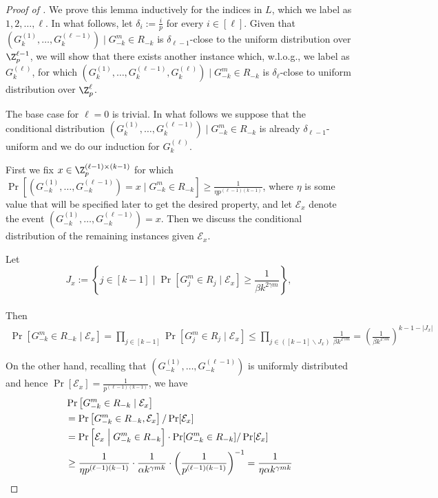 \documentclass{toc}
\newcommand{\set}[1]{{\left \{{#1} \right \}}}
\newcommand{\cond}{\;|\;}
\newcommand{\Cond}{\;\Big|\;}
\newcommand{\error}{\ensuremath{\delta}}
\newcommand{\eqdef}{\ensuremath{:=}}
\newcommand{\event}{\ensuremath{\mathcal{E}}}
\begin{document}
	\begin{proof}[Proof of ]
		We prove this lemma inductively for the indices in $L$, {\color{black}which we label as $1,2, \dots, \ell$.}
		In what follows, let $\error_{i}\eqdef \frac{i}{p}$ for every $i\in [\ell]$.
		Given that $\left(G_k^{(1)},\dots,G_k^{(\ell-1)}\right)\Cond G_{-k}^m \in R_{-k}$ is $\error_{\ell-1}$-close to the uniform distribution over $\Z_p^{\ell-1}$, we will show that there exists another instance which, w.l.o.g., we label as $G_k^{(\ell)} $, for which 
		$\left(G_k^{(1)},\dots,G_k^{(\ell-1)},G_k^{(\ell)}\right)\Cond G_{-k}^m \in R_{-k}$ is $\error_{\ell}$-close to uniform distribution over $\Z_p^{\ell}$.
		
		The base case for $\ell=0$ is trivial. 
		In what follows we suppose that the conditional distribution $\left(G_k^{(1)},\dots,G_k^{(\ell-1)}\right)\Cond G_{-k}^m \in R_{-k}$ is already $\error_{\ell-1}$-uniform and we do our induction for $G_k^{(\ell)}$.

		First we fix $x\in \Z_p^{(\ell-1)\times (k-1)}$ for which $\Pr\left[\left(G_{-k}^{(1)},\dots,G_{-k}^{(\ell-1)}\right)=x \cond G_{-k}^m\in R_{-k} \right] \ge \frac{1}{\eta  p^{(\ell-1)(k-1)}}$, {\color{black} where $\eta$ is some value that will be specified later to get the desired property,}
		and let $\event_x$ denote  the event 
		$\left(G_{-k}^{(1)},\dots,G_{-k}^{(\ell-1)}\right)=x$.  
		Then we discuss the conditional distribution of the remaining instances given $\event_x$.


		Let
		$$J_x \eqdef \set{j\in [k-1] \; \Big| \; \Pr\left[G^m_j\in R_j\; \big| \; \event_x\right] \ge \frac{1}{\beta k^{2\gamma m}} },$$
		\\
		Then
		\begin{align}\label{ineq:A1_upper}
			\Pr\left[ G^m_{-k}\in R_{-k} \cond \event_x \right] =
		\prod_{j\in [k-1]} 
			\Pr\left[ G_j^m\in R_j \cond  \event_x \right]
			\le 
			\prod_{j\in ([k-1]\backslash J_x)} \frac{1}{\beta k^{2\gamma m}} = \left( \frac{1}{\beta k^{2\gamma m}} \right)^{k-1-|J_x|}
		\end{align}


		On the other hand, recalling that $\left(G_{-k}^{(1)},\dots,G_{-k}^{(\ell-1)}\right)$ is uniformly distributed and hence $\Pr[\event_x]=\frac{1}{p^{(\ell-1)(k-1)}}$, we have
		\begin{align}
			& \Pr\left[ G^m_{-k}\in R_{-k} \cond \event_x \right] \notag \\
			&=\Pr\left[G^m_{-k}\in R_{-k},\event_x\right] / \Pr[\event_x]
			\notag\\
			&= \Pr\left[ \event_x \Cond G_{-k}^m\in R_{-k} \right] \cdot \Pr[G_{-k}^m\in R_{-k}]/\Pr[\event_x] \notag \\
			&\ge  \frac{1}{\eta p^{(\ell-1)(k-1)}} \cdot \frac{1}{\alpha k^{\gamma mk}} \cdot \left(\frac{1}{p^{(\ell-1)(k-1)}}\right)^{-1}
			=\frac{1}{\eta \alpha k^{\gamma mk}}
			\label{ineq:A1_lower}
		\end{align}


\end{proof}
\end{document}
